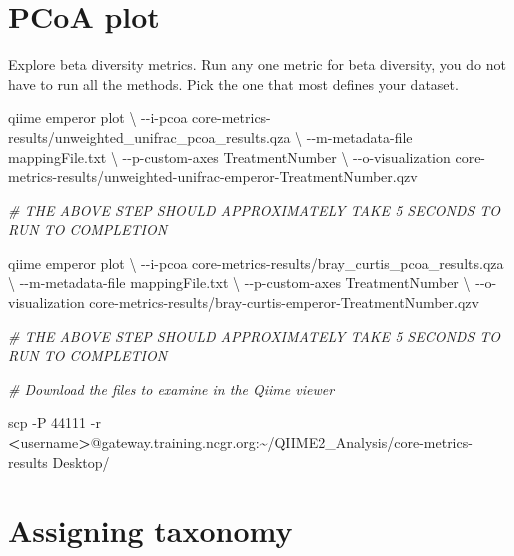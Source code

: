 \documentclass[
]{book}
\newenvironment{Shaded}{\begin{snugshade}}{\end{snugshade}}
\newcommand{\AttributeTok}[1]{\textcolor[rgb]{0.77,0.63,0.00}{#1}}
\newcommand{\CommentTok}[1]{\textcolor[rgb]{0.56,0.35,0.01}{\textit{#1}}}
\newcommand{\DataTypeTok}[1]{\textcolor[rgb]{0.13,0.29,0.53}{#1}}
\newcommand{\ExtensionTok}[1]{#1}
\newcommand{\FunctionTok}[1]{\textcolor[rgb]{0.00,0.00,0.00}{#1}}
\newcommand{\NormalTok}[1]{#1}
\newcommand{\OperatorTok}[1]{\textcolor[rgb]{0.81,0.36,0.00}{\textbf{#1}}}
\begin{document}
\hypertarget{pcoa-plot}{%
\section{PCoA plot}\label{pcoa-plot}}

Explore beta diversity metrics. Run any one metric for beta diversity, you do not have to run all the methods. Pick the one that most defines your dataset.

\begin{Shaded}
\begin{Highlighting}[]

\ExtensionTok{qiime}\NormalTok{ emperor plot }\DataTypeTok{\textbackslash{}}
\NormalTok{{-}{-}i{-}pcoa core{-}metrics{-}results/unweighted\_unifrac\_pcoa\_results.qza }\DataTypeTok{\textbackslash{}}
\NormalTok{{-}{-}m{-}metadata{-}file mappingFile.txt }\DataTypeTok{\textbackslash{}}
\NormalTok{{-}{-}p{-}custom{-}axes TreatmentNumber  }\DataTypeTok{\textbackslash{}}
\NormalTok{{-}{-}o{-}visualization core{-}metrics{-}results/unweighted{-}unifrac{-}emperor{-}TreatmentNumber.qzv}

\CommentTok{\# THE ABOVE STEP SHOULD APPROXIMATELY TAKE 5 SECONDS TO RUN TO COMPLETION}

\ExtensionTok{qiime}\NormalTok{ emperor plot }\DataTypeTok{\textbackslash{}}
\NormalTok{{-}{-}i{-}pcoa core{-}metrics{-}results/bray\_curtis\_pcoa\_results.qza }\DataTypeTok{\textbackslash{}}
\NormalTok{{-}{-}m{-}metadata{-}file mappingFile.txt }\DataTypeTok{\textbackslash{}}
\NormalTok{{-}{-}p{-}custom{-}axes TreatmentNumber }\DataTypeTok{\textbackslash{}}
\NormalTok{{-}{-}o{-}visualization core{-}metrics{-}results/bray{-}curtis{-}emperor{-}TreatmentNumber.qzv}

\CommentTok{\# THE ABOVE STEP SHOULD APPROXIMATELY TAKE 5 SECONDS TO RUN TO COMPLETION}

\CommentTok{\# Download the files to examine in the Qiime viewer}

\FunctionTok{scp} \AttributeTok{{-}P}\NormalTok{ 44111 }\AttributeTok{{-}r} \OperatorTok{\textless{}}\NormalTok{username}\OperatorTok{\textgreater{}}\NormalTok{@gateway.training.ncgr.org:\textasciitilde{}/QIIME2\_Analysis/core{-}metrics{-}results Desktop/}
\end{Highlighting}
\end{Shaded}

\hypertarget{assigning-taxonomy}{%
\section{Assigning taxonomy}\label{assigning-taxonomy}}
\end{document}
